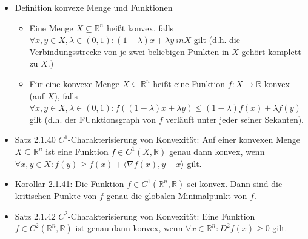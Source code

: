 \documentclass[paper=a4, fontsize=11pt]{scrartcl} %
\numberwithin{equation}{section} %
\numberwithin{figure}{section} %
\numberwithin{table}{section} %
\begin{document}
\begin{itemize}
\item Definition konvexe Menge und Funktionen
\begin{itemize}
\item Eine Menge $X \subseteq \mathbb{R}^n$ heißt konvex, falls $\forall x,y \in X, \lambda \in (0,1): (1-\lambda)x + \lambda y \ in X$ gilt (d.h. die Verbindungsstrecke von je zwei beliebigen Punkten in $X$ gehört komplett zu $X$.)
\item Für eine konvexe Menge $X \subseteq \mathbb{R}^n$ heißt eine Funktion $f: X \rightarrow \mathbb{R}$ konvex (auf $X$), falls $\forall x,y \in X, \lambda \in (0,1): f((1-\lambda)x+\lambda y) \le (1-\lambda)f(x) + \lambda f(y)$ gilt (d.h. der FUnktionsgraph von $f$ verläuft unter jeder seiner Sekanten).
\end{itemize}
\item Satz 2.1.40 $C^1$-Charakterisierung von Konvexität: Auf einer konvexen Menge $X \subseteq \mathbb{R}^n$ ist eine Funktion $f \in C^1(X,\mathbb{R})$ genau dann konvex, wenn $\forall x,y \in X: f(y) \ge f(x) + \langle \nabla f(x),y-x\rangle$ gilt.
\item Korollar 2.1.41: Die Funktion $f \in C^1(\mathbb{R}^n,\mathbb{R})$ sei konvex. Dann sind die kritischen Punkte von $f$ genau die globalen Minimalpunkt von $f$.
\item Satz 2.1.42 $C^2$-Charakterisierung von Konvexität: Eine Funktion $f \in C^2(\mathbb{R}^n,\mathbb{R})$ ist genau dann konvex, wenn $\forall x \in \mathbb{R}^n: D^2f(x) \ge 0$ gilt.
\end{itemize}
\end{document}
